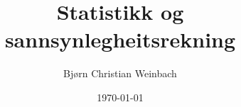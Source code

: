 \documentclass[10pt, a4paper, nynorsk]{report}          %
\title{Statistikk og sannsynlegheitsrekning} %
\author{Bjørn Christian Weinbach}                   %
\date{\today}                                       %
\begin{document}
    
\maketitle                                          %

\begin{abstract}                                    %
\end{abstract}

\tableofcontents




\end{document}
